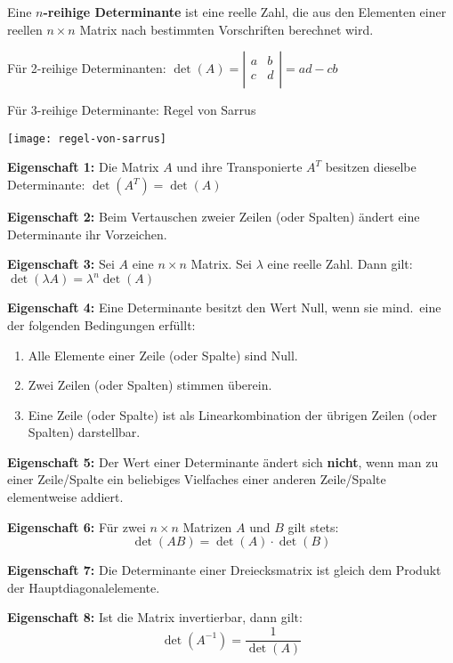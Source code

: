 

Eine \textbf{$n$-reihige Determinante} ist eine reelle Zahl, die aus den Elementen einer reellen $n \times n$ Matrix nach bestimmten Vorschriften berechnet wird.

Für 2-reihige Determinanten: $\det(A) = \left|
\begin{array}{cc}
    a & b \\
    c & d \\
\end{array}
\right| = ad - cb$

Für 3-reihige Determinante: Regel von Sarrus

\texttt{[image: regel-von-sarrus]}


\textbf{Eigenschaft 1:} Die Matrix $A$ und ihre Transponierte $A^T$ besitzen dieselbe Determinante: $\det(A^T) = \det(A)$

\textbf{Eigenschaft 2:} Beim Vertauschen zweier Zeilen (oder Spalten) ändert eine Determinante ihr Vorzeichen.

\textbf{Eigenschaft 3:} Sei $A$ eine $n \times n$ Matrix.
Sei $\lambda$ eine reelle Zahl.
Dann gilt: $\det(\lambda A) = \lambda^n \det(A)$

\textbf{Eigenschaft 4:} Eine Determinante besitzt den Wert Null, wenn sie mind.\ eine der folgenden Bedingungen erfüllt:
\begin{enumerate}
    \item Alle Elemente einer Zeile (oder Spalte) sind Null.
    \item Zwei Zeilen (oder Spalten) stimmen überein.
    \item Eine Zeile (oder Spalte) ist als Linearkombination der übrigen Zeilen (oder Spalten) darstellbar.
\end{enumerate}

\textbf{Eigenschaft 5:} Der Wert einer Determinante ändert sich \textbf{nicht}, wenn man zu einer Zeile/Spalte ein beliebiges Vielfaches einer anderen Zeile/Spalte elementweise addiert.

\textbf{Eigenschaft 6:} Für zwei $n \times n$ Matrizen $A$ und $B$ gilt stets: \[\det(AB) = \det(A) \cdot \det(B)\]

\textbf{Eigenschaft 7:} Die Determinante einer Dreiecksmatrix ist gleich dem Produkt der Hauptdiagonalelemente.

\textbf{Eigenschaft 8:} Ist die Matrix invertierbar, dann gilt: \[\det(A^{-1}) = \frac{1}{\det(A)}\]

